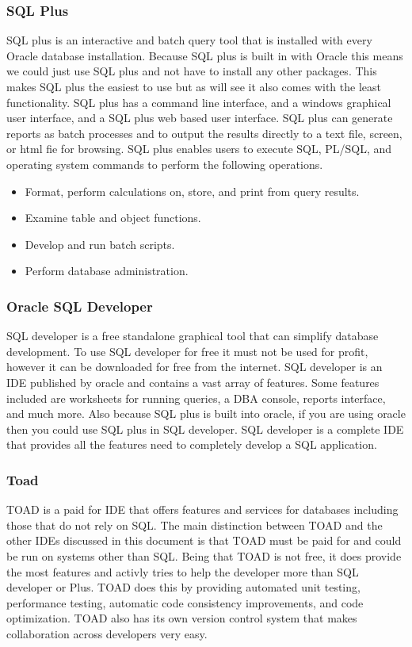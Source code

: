 \documentclass[draftclsnofoot, onecolumn, compsoc, 10pt]{IEEEtran}
\begin{document}
\subsubsection{SQL Plus}
SQL plus is an interactive and batch query tool that is installed with every Oracle database installation. 
Because SQL plus is built in with Oracle this means we could just use SQL plus and not have to install any other packages.
This makes SQL plus the easiest to use but as will see it also comes with the least functionality. 
SQL plus has a command line interface, and a windows graphical user interface, and a SQL plus web based user interface. 
SQL plus can generate reports as batch processes and to output the results directly to a text file, screen, or html fie for browsing.
SQL plus enables users to execute SQL, PL/SQL, and operating system commands to perform the following operations.
\begin{itemize}
	\item Format, perform calculations on, store, and print from query results.
	\item Examine table and object functions.
	\item Develop and run batch scripts.
	\item Perform database administration.
\end{itemize}

\subsubsection{Oracle SQL Developer}
SQL developer is a free standalone graphical tool that can simplify database development. 
To use SQL developer for free it must not be used for profit, however it can be downloaded for free from the internet.
SQL developer is an IDE published by oracle and contains a vast array of features.
Some features included are worksheets for running queries, a DBA console, reports interface, and much more.
Also because SQL plus is built into oracle, if you are using oracle then you could use SQL plus in SQL developer. 
SQL developer is a complete IDE that provides all the features need to completely develop a SQL application.
 
\subsubsection{Toad}
TOAD is a paid for IDE that offers features and services for databases including those that do not rely on SQL.
The main distinction between TOAD and the other IDEs discussed in this document is that TOAD must be paid for and could be run on systems other than SQL.
Being that TOAD is not free, it does provide the most features and activly tries to help the developer more than SQL developer or Plus.
TOAD does this by providing automated unit testing, performance testing, automatic code consistency improvements, and code optimization.
TOAD also has its own version control system that makes collaboration across developers very easy.
\end{document}
